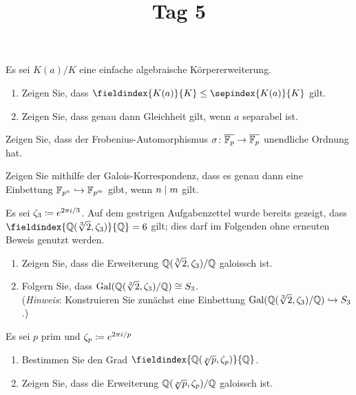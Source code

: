 \documentclass[a4paper, 10pt]{scrartcl}
\title{Tag 5}
\author{}
\date{}
\begin{document}
\begin{question}
  Es sei $K(a)/K$ eine einfache algebraische Körpererweiterung.
  \begin{enumerate}
    \item
      Zeigen Sie, dass $\fieldindex{K(a)}{K} \leq \sepindex{K(a)}{K}$ gilt.
    \item
      Zeigen Sie, dass genau dann Gleichheit gilt, wenn $a$ separabel ist.
  \end{enumerate}
\end{question}

\begin{question}
  Zeigen Sie, dass der Frobenius-Automorphismus $\sigma \colon \overline{\mathbb{F}_p} \to \overline{\mathbb{F}_p}$ unendliche Ordnung hat.
\end{question}

\begin{question}
  Zeigen Sie mithilfe der Galois-Korrespondenz, dass es genau dann eine Einbettung $\mathbb{F}_{p^n} \hookrightarrow \mathbb{F}_{p^m}$ gibt, wenn $n \mathrel{|} m$ gilt.
\end{question}

\begin{question}
  Es sei $\zeta_3 \coloneqq e^{2 \pi i /3}$.
  Auf dem gestrigen Aufgabenzettel wurde bereits gezeigt, dass $\fieldindex{\Rational(\sqrt[3]{2}, \zeta_3)}{\Rational} = 6$ gilt;
  dies darf im Folgenden ohne erneuten Beweis genutzt werden.
  \begin{enumerate}
    \item
      Zeigen Sie, dass die Erweiterung $\mathbb{Q}(\sqrt[3]{2}, \zeta_3)/\mathbb{Q}$ galoissch ist.
    \item
      Folgern Sie, dass $\operatorname{Gal}(\mathbb{Q}(\sqrt[3]{2}, \zeta_3)/\mathbb{Q}) \cong S_3$.
      \\
      (\emph{Hinweis}:
       Konstruieren Sie zunächst eine Einbettung $\operatorname{Gal}(\mathbb{Q}(\sqrt[3]{2}, \zeta_3)/\mathbb{Q}) \hookrightarrow S_3$.)
  \end{enumerate}
\end{question}

\begin{question}
  Es sei $p$ prim und $\zeta_p \coloneqq e^{2 \pi i / p}$
  \begin{enumerate}
    \item
      Bestimmen Sie den Grad $\fieldindex{\Rational(\sqrt[p]{p}, \zeta_p)}{\Rational}$.
    \item
      Zeigen Sie, dass die Erweiterung $\mathbb{Q}(\sqrt[p]{p}, \zeta_p)/\mathbb{Q}$ galoissch ist.
  \end{enumerate}
\end{question}
\end{document}
